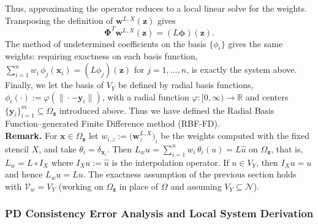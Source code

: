 \documentclass[11pt]{article}
\begin{document}
Thus, approximating the operator reduces to a local linear solve for the weights. Transposing the definition of $\bm{w}^{L,X}(\bm{z})$ gives
\begin{equation}
	\bm{\Phi}^T \bm{w}^{L, X}(\bm{z}) = (L \bm{\phi})(\bm{z}).
	\label{eq:pd_local}
\end{equation}
The method of undetermined coefficients on the basis $\{\phi_i\}$ gives the same weights: requiring exactness on each basis function, $\sum_{i=1}^n w_i \, \phi_j(\bm{x}_i) = (L\phi_j)(\bm{z})$ for $j = 1, \dots, n$, is exactly the system above. Finally, we let the basis of $V_Y$ be defined by radial basis functions, $\phi_i(\cdot):=\varphi(\| \cdot - \bm{y}_i \|)$, with a radial function $\varphi:[0,\infty) \rightarrow \mathbb{R}$ and centers $\{ \bm{y}_i \}_{i=1}^m \subseteq \Omega_{\bm{z}}$ introduced above. Thus we have defined the Radial Basis Function--generated Finite Difference method (RBF-FD).
\\
\noindent\textbf{Remark.} For $\bm{x} \in \Omega_{\bm{z}}$ let $w_{i,z} := \bigl( \bm{w}^{L,X}_z \bigr)_i$ be the weights computed with the fixed stencil $X$, and take $\theta_i = \delta_{\bm{x}_i}$. Then $L_w u = \sum_{i=1}^n w_i \, \theta_i(u) = L\hat{u}$ on $\Omega_{\bm{z}}$, that is, $L_w = L \circ I_X$ where $I_X u := \hat{u}$ is the interpolation operator. If $u \in V_Y$, then $I_X u = u$ and hence $L_w u = Lu$. The exactness assumption of the previous section holds with $\mathcal{V}_w = V_Y$ (working on $\Omega_{\bm{z}}$ in place of $\Omega$ and assuming $V_Y \subseteq \mathcal{N}$).

\subsubsection{PD Consistency Error Analysis and Local System Derivation}
\end{document}
